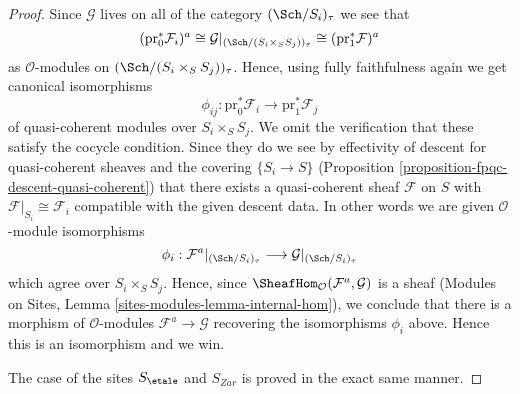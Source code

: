 \begin{proof}
\medskip\noindent
Since $\mathcal{G}$ lives on all of the category
$(\Sch/S_i)_\tau$ we see that
$$
(\text{pr}_0^*\mathcal{F}_i)^a
\cong
\mathcal{G}|_{(\Sch/(S_i \times_S S_j))_\tau}
\cong
(\text{pr}_1^*\mathcal{F})^a
$$
as $\mathcal{O}$-modules on $(\Sch/(S_i \times_S S_j))_\tau$.
Hence, using fully faithfulness again we get canonical isomorphisms
$$
\phi_{ij} :
\text{pr}_0^*\mathcal{F}_i
\longrightarrow
\text{pr}_1^*\mathcal{F}_j
$$
of quasi-coherent modules over $S_i \times_S S_j$. We omit the verification
that these satisfy the cocycle condition. Since they do we see by
effectivity of descent for quasi-coherent sheaves and the covering
$\{S_i \to S\}$ (Proposition \ref{proposition-fpqc-descent-quasi-coherent})
that there exists a quasi-coherent sheaf $\mathcal{F}$ on $S$
with $\mathcal{F}|_{S_i} \cong \mathcal{F}_i$ compatible
with the given descent data. In other words we are given
$\mathcal{O}$-module isomorphisms
$$
\phi_i :
\mathcal{F}^a|_{(\Sch/S_i)_\tau}
\longrightarrow
\mathcal{G}|_{(\Sch/S_i)_\tau}
$$
which agree over $S_i \times_S S_j$. Hence, since
$\SheafHom_\mathcal{O}(\mathcal{F}^a, \mathcal{G})$ is
a sheaf (Modules on Sites, Lemma \ref{sites-modules-lemma-internal-hom}),
we conclude that
there is a morphism of $\mathcal{O}$-modules $\mathcal{F}^a \to \mathcal{G}$
recovering the isomorphisms $\phi_i$ above. Hence this is an isomorphism
and we win.

\medskip\noindent
The case of the sites $S_\etale$ and $S_{Zar}$ is proved in the
exact same manner.
\end{proof}

